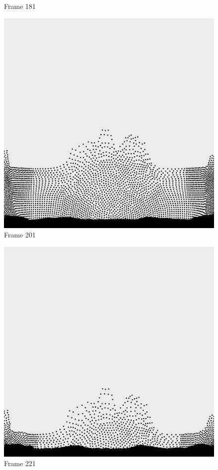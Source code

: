 \documentclass[a4paper, 12pt, oneside]{book}
\begin{document}
\begin{figure}[!ht]
\begin{center}
            Frame 181
        \end{center}
    \endminipage
    \hfill
        \begin{center}
            \includegraphics[width=\linewidth]{images/test_case_1/201.png}
            Frame 201
        \end{center}
    \endminipage
    \hfill
        \begin{center}
            \includegraphics[width=\linewidth]{images/test_case_1/221.png}
            Frame 221
        \end{center}
    \endminipage
    \hfill


\end{figure}
\end{document}
